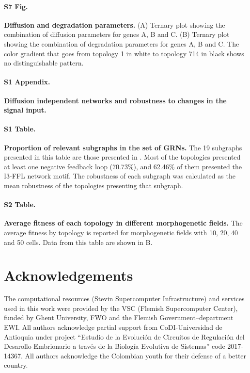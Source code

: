 \documentclass[10pt,letterpaper]{article}
\begin{document}
\paragraph*{S7 Fig.}
\label{S7_Fig}
{\bf Diffusion and degradation parameters.}
(A) Ternary plot showing the combination of diffusion parameters for genes A,
B and C. (B) Ternary plot showing the combination of degradation parameters
for genes A, B and C. The color gradient that goes from topology 1 in white to
topology 714 in black shows no distinguishable pattern.

\paragraph*{S1 Appendix.}
\label{S1_Appendix}
{\bf Diffusion independent networks and robustness to changes in the signal input.}

\paragraph*{S1 Table.}
\label{S1_Table}
{\bf Proportion of relevant subgraphs in the set of GRNs.}
The 19 subgraphs presented in this table are those presented in .
Most of the topologies presented at least one negative feedback loop (70.73\%),
and 62.46\% of them presented the I3-FFL network motif. The robustness of each
subgraph was calculated as the mean robustness of the topologies presenting that
subgraph.

\paragraph*{S2 Table.}
\label{S2_Table}
{\bf Average fitness of each topology in different morphogenetic fields.}
The average fitness by topology is reported for morphogenetic fields with 10, 20,
40 and 50 cells. Data from this table are shown in B.

\section*{Acknowledgements}
The computational resources (Stevin Supercomputer Infrastructure) and
services used in this work were provided by the VSC (Flemish Supercomputer
Center), funded by Ghent University, FWO and the Flemish Government–department EWI.
All authors acknowledge partial support from CoDI-Universidad de Antioquia under
project ``Estudio de la Evolución de Circuitos de Regulación del Desarollo
Embrionario a través de la Biología Evolutiva de Sistemas'' code 2017-14367. All
authors acknowledge the Colombian youth for their defense of a better country.

\nolinenumbers

{}
\end{document}
